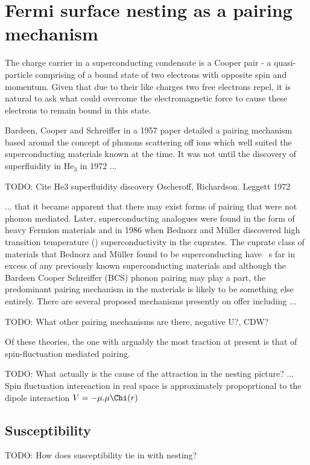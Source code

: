 
\section{Fermi surface nesting as a pairing mechanism}

The charge carrier in a superconducting condensate is a Cooper pair - a quasi-particle comprising of a bound state of two electrons with opposite spin and momentum. Given that due to their like charges two free electrons repel, it is natural to ask what could overcome the electromagnetic force to cause these electrons to remain bound in this state.

Bardeen, Cooper and Schreiffer in a 1957 paper\cite{Bardeen1957} detailed a pairing mechanism based around the concept of phonons scattering off ions which well suited the superconducting materials known at the time. It was not until the discovery of superfluidity in He$_3$ in 1972 ...

TODO: Cite He3 superfluidity discovery Oscheroff, Richardson. Leggett 1972

... that it became apparent that there may exist forms of pairing that were not phonon mediated. Later, superconducting analogues were found in the form of heavy Fermion materials and in 1986 when Bednorz and M\"uller\cite{Bednorz} discovered high transition temperature (\Tc) superconductivity in the cuprates. The cuprate class of materials that Bednorz and M\"uller found to be superconducting have \Tc~s far in excess of any previously known superconducting materials and although the Bardeen Cooper Schreiffer (BCS) phonon pairing may play a part, the predominant pairing mechanism in the \highTc materials is likely to be something else entirely\cite{Mazin2008}. There are several proposed mechanisms presently on offer including ...

TODO: What other pairing mechanisms are there, negative U?, CDW?

Of these theories, the one with arguably the most traction at present is that of spin-fluctuation mediated pairing. 

TODO: What actually is the cause of the attraction in the nesting picture? ... Spin fluctuation intereaction in real space is approximately propoprtional to the dipole interaction $V=-\mu . \mu \Chi(r)$\cite{Bergemann2003} 

\subsection{Susceptibility}
    \label{Sec:1:NestingSusceptibility}

TODO: How does susceptibility tie in with nesting?
